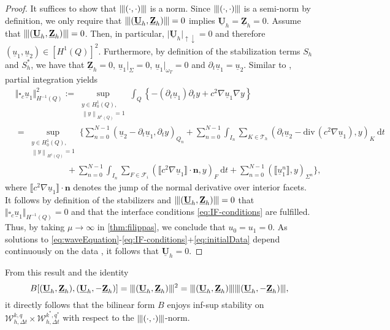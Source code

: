 \documentclass[sn-mathphys-num]{sn-jnl}
\numberwithin{equation}{section}
\newcommand{\jump}[1]{\llbracket#1\rrbracket}
\renewcommand{\div}{\mathrm{div}\,}  %
\newcommand{\wop}{\square_c}
\newcommand{\tnorm}[1]{\vert\hspace{-0.3mm}\Vert#1\Vert\hspace{-0.3mm}\vert}
\providecommand{\norm}[1]{\left\lVert#1\right\rVert}
\providecommand{\norm}[1]{\left\lVert#1\right\rVert}
\newcommand{\dT}{\mathrm{d}t}
\newcommand{\ProdFullyDiscrSpace}[2]{ \mathcal{W}^{ {#1},{#2}}_{h, \Delta t  } }
\newcommand{\Uh}{\underline{\mathbf{U}}_h}
\newcommand{\Zh}{\underline{\mathbf{Z}}_h}
\newcommand{\ul}{\underline{u}}
\newcommand{\dt}{\partial_t}
\begin{document}
\begin{proof}
    It suffices to show that $\tnorm{(\cdot,\cdot)}$ is a norm. Since $\tnorm{(\cdot,\cdot)}$ is a semi-norm by definition, we only require that $\tnorm{(\Uh,\Zh)} = 0$ implies $\Uh=\Zh= 0$. Assume that $\tnorm{(\Uh,\Zh)} = 0$. Then, in particular, $\vert \Uh \vert_{\uparrow \downarrow} = 0$ and therefore $(\ul_1,\ul_2) \in [H^1(Q)]^2$. Furthermore, by definition of the stabilization terms $S_h$ and $S_h^{\ast}$, we have that $\Zh = 0$, $\ul_1 \vert_{\Sigma} = 0$, $\ul_1 \vert_{\omega_T} = 0$ and $\dt \ul_1 = \ul_2$. Similar to \cite[Lem. 2.1]{BP24}, partial integration yields 
    \begin{align*}
	   & \Vert \wop \ul_1 \Vert^2_{H^{-1}(Q)} := \sup_{\substack{  y \in H^1_0(Q), \\ \norm{y}_{H^1(Q) } = 1  }} \int_{Q} \left\{ -(\dt \ul_1) \dt y + c^2 \nabla \ul_1 \nabla y \right\}  \\
        &= \sup_{\substack{  y \in H^1_0(Q), \\ \norm{y}_{H^1(Q) } = 1  }} \Big\{ \sum_{n = 0}^{N-1} (\ul_2 - \dt \ul_1, \dt y)_{Q_n} 
        + \sum_{n = 0}^{N-1} \int_{I_n} \sum_{K \in \mathcal{T}_h} (\dt \ul_2 - \div(c^2 \nabla \ul_1),y)_{K} \ \dT \\
	    & \hspace{6em} + \sum_{n = 0}^{N-1} \int_{I_n} \sum_{F \in \mathcal{F}_i} (\jump{c^2 \nabla \ul_1} \cdot \mathbf{n}, y)_F \ \dT + \sum_{n = 0}^{N-1} (\jump{\ul_1^n},y)_{\Sigma^n} \Big\},
    \end{align*}
where $\jump{c^2 \nabla \ul_1} \cdot \mathbf{n}$  denotes the jump of the normal derivative over interior facets. It follows by definition of the stabilizers and $\tnorm{(\Uh,\Zh)} = 0$ that $\Vert \wop \ul_1 \Vert_{H^{-1}(Q)} = 0$ and that the interface conditions \eqref{eq:IF-conditions} are fulfilled. Thus, by taking $\mu \rightarrow \infty$ in \cref{thm:filippas}, we conclude that $u_0 = u_1 = 0$. As solutions to \eqref{eq:waveEquation}-\eqref{eq:IF-conditions}+\eqref{eq:initialData} depend continuously on the data \cite{StolkPhD}, it follows that $\Uh = 0$. 
\end{proof}

 From this result and the identity
\[
B[(\Uh,\Zh),(\Uh,-\Zh)] = \tnorm{(\Uh,\Zh)}^2 = \tnorm{(\Uh,\Zh)}\tnorm{(\Uh,-\Zh)},
\]
it directly follows that the bilinear form $B$ enjoys inf-sup stability on $\ProdFullyDiscrSpace{k}{q} \times \ProdFullyDiscrSpace{k^\ast}{q^\ast}$ with respect to the $\tnorm{(\cdot,\cdot)}$-norm. 
\end{document}
